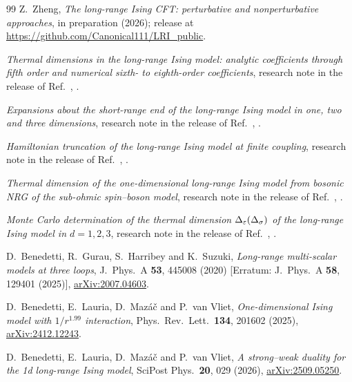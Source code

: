 {}
\begin{thebibliography}{99}
Z.~Zheng, \emph{The long-range Ising CFT: perturbative and nonperturbative approaches}, in
preparation (2026); release at
\url{https://github.com/Canonical111/LRI_public}.

\emph{Thermal dimensions in the long-range Ising model: analytic coefficients through fifth
order and numerical sixth- to eighth-order coefficients}, research note in the release of
Ref.~\cite{rs:LRIpaper}, .

\emph{Expansions about the short-range end of the long-range Ising model in one, two and three
dimensions}, research note in the release of Ref.~\cite{rs:LRIpaper},
.

\emph{Hamiltonian truncation of the long-range Ising model at finite coupling}, research note
in the release of Ref.~\cite{rs:LRIpaper}, .

\emph{Thermal dimension of the one-dimensional long-range Ising model from bosonic NRG of the
sub-ohmic spin--boson model}, research note in the release of Ref.~\cite{rs:LRIpaper},
.

\emph{Monte Carlo determination of the thermal dimension $\Delta_\varepsilon(\Delta_\sigma)$ of the long-range Ising
model in $d=1,2,3$}, research note in the release of Ref.~\cite{rs:LRIpaper},
.

D.~Benedetti, R.~Gurau, S.~Harribey and K.~Suzuki,
\emph{Long-range multi-scalar models at three loops},
J.\ Phys.\ A \textbf{53}, 445008 (2020) [Erratum: J.\ Phys.\ A \textbf{58}, 129401 (2025)],
\href{https://arxiv.org/abs/2007.04603}{arXiv:2007.04603}.

D.~Benedetti, E.~Lauria, D.~Maz\'a\v c and P.~van Vliet,
\emph{One-dimensional Ising model with $1/r^{1.99}$ interaction},
Phys.\ Rev.\ Lett.\ \textbf{134}, 201602 (2025),
\href{https://arxiv.org/abs/2412.12243}{arXiv:2412.12243}.

D.~Benedetti, E.~Lauria, D.~Maz\'a\v c and P.~van Vliet,
\emph{A strong--weak duality for the 1d long-range Ising model},
SciPost Phys.\ \textbf{20}, 029 (2026),
\href{https://arxiv.org/abs/2509.05250}{arXiv:2509.05250}.


\end{thebibliography}

